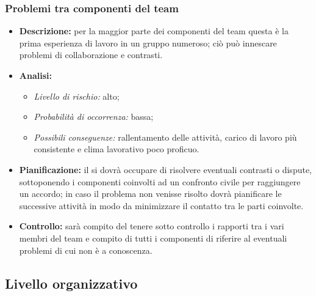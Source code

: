 		\subsubsection{Problemi tra componenti del team}
			\begin{itemize}
				\item \textbf{Descrizione:} per la maggior parte dei componenti del team questa è la prima esperienza di lavoro in un gruppo numeroso; ciò può  innescare problemi di collaborazione e contrasti.
				\item \textbf{Analisi:}
				\begin{itemize}
					\item \textit{Livello di rischio:} alto;
					\item \textit{Probabilità di occorrenza:} bassa;
					\item \textit{Possibili conseguenze:} rallentamento delle attività, carico di lavoro più consistente e clima lavorativo poco proficuo.
				\end{itemize}
				\item \textbf{Pianificazione:} il  si dovrà occupare di risolvere eventuali contrasti o dispute, sottoponendo i componenti coinvolti ad un confronto civile per raggiungere un accordo; in caso il problema non venisse risolto dovrà pianificare le successive attività in modo da minimizzare il contatto tra le parti coinvolte.
				\item \textbf{Controllo:} sarà compito del  tenere sotto controllo i rapporti tra i vari membri del team e compito di tutti i componenti di riferire al  eventuali problemi di cui non è a conoscenza.
			\end{itemize}
	\subsection{Livello organizzativo}
